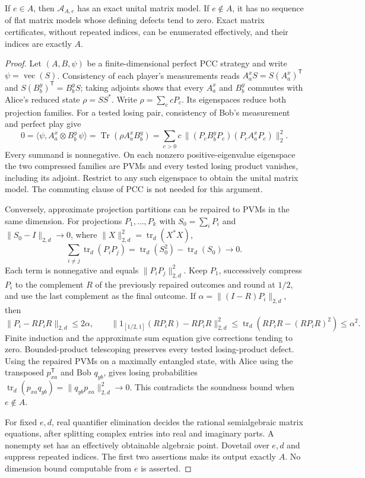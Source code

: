 \begin{lemma}\label{lem:gate-witnesses}
If $e\in A$, then $\mathcal A_{A,e}$ has an exact unital matrix model. If $e\notin A$, it has no sequence of flat matrix models whose defining defects tend to zero. Exact matrix certificates, without repeated indices, can be enumerated effectively, and their indices are exactly $A$.
\end{lemma}
\begin{proof}
Let $(A,B,\psi)$ be a finite-dimensional perfect PCC strategy and write $\psi=\operatorname{vec}(S)$. Consistency of each player's measurements reads $A^x_aS=S(A^x_a)^{\mathsf T}$ and $S(B^y_b)^{\mathsf T}=B^y_bS$; taking adjoints shows that every $A^x_a$ and $B^y_b$ commutes with Alice's reduced state $\rho=SS^*$. Write $\rho=\sum_c cP_c$. Its eigenspaces reduce both projection families. For a tested losing pair, consistency of Bob's measurement and perfect play give
\[
 0=\langle\psi,A^x_a\otimes B^y_b\,\psi\rangle
 =\operatorname{Tr}(\rho A^x_aB^y_b)
 =\sum_{c>0}c\,\|(P_cB^y_bP_c)(P_cA^x_aP_c)\|_2^2.
\]
Every summand is nonnegative. On each nonzero positive-eigenvalue eigenspace the two compressed families are PVMs and every tested losing product vanishes, including its adjoint. Restrict to any such eigenspace to obtain the unital matrix model. The commuting clause of PCC is not needed for this argument.

Conversely, approximate projection partitions can be repaired to PVMs in the same dimension. For projections $P_1,\ldots,P_k$ with $S_0=\sum_iP_i$ and $\|S_0-I\|_{2,d}\to0$, where $\|X\|_{2,d}^2=\operatorname{tr}_d(X^*X)$,
\[
 \sum_{i\ne j}\operatorname{tr}_d(P_iP_j)
 =\operatorname{tr}_d(S_0^2)-\operatorname{tr}_d(S_0)\longrightarrow0.
\]
Each term is nonnegative and equals $\|P_iP_j\|_{2,d}^2$. Keep $P_1$, successively compress $P_i$ to the complement $R$ of the previously repaired outcomes and round at $1/2$, and use the last complement as the final outcome. If $\alpha=\|(I-R)P_i\|_{2,d}$, then
\[
 \|P_i-RP_iR\|_{2,d}\le2\alpha,\qquad
 \|1_{[1/2,1]}(RP_iR)-RP_iR\|_{2,d}^2
 \le\operatorname{tr}_d(RP_iR-(RP_iR)^2)\le\alpha^2.
\]
Finite induction and the approximate sum equation give corrections tending to zero. Bounded-product telescoping preserves every tested losing-product defect. Using the repaired PVMs on a maximally entangled state, with Alice using the transposed $p_{xa}^{\mathsf T}$ and Bob $q_{yb}$, gives losing probabilities $\operatorname{tr}_d(p_{xa}q_{yb})=\|q_{yb}p_{xa}\|_{2,d}^2\to0$. This contradicts the soundness bound when $e\notin A$.

For fixed $e,d$, real quantifier elimination decides the rational semialgebraic matrix equations, after splitting complex entries into real and imaginary parts. A nonempty set has an effectively obtainable algebraic point. Dovetail over $e,d$ and suppress repeated indices. The first two assertions make its output exactly $A$. No dimension bound computable from $e$ is asserted.
\end{proof}

